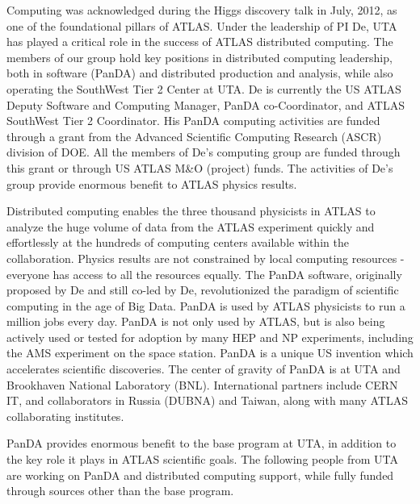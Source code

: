 
Computing was acknowledged during the Higgs discovery talk in July, 2012, as one of the foundational pillars of ATLAS. Under the leadership of PI De, UTA has played a critical role in the success of ATLAS distributed computing. The members of our group hold key positions in distributed computing leadership, both in software (PanDA) and distributed production and analysis, while also operating the SouthWest Tier 2 Center at UTA. De is currently the US ATLAS Deputy Software and Computing Manager, PanDA co-Coordinator, and ATLAS SouthWest Tier 2 Coordinator. His PanDA computing activities are funded through a grant from the Advanced Scientific Computing Research (ASCR) division of DOE. All the members of De's computing group are funded through this grant or through US ATLAS M\&O (project) funds. The activities of De's group provide enormous benefit to ATLAS physics results.

Distributed computing enables the three thousand physicists in ATLAS to analyze the huge volume of data from the ATLAS experiment quickly and effortlessly at the hundreds of computing centers available within the collaboration. Physics results are not constrained by local computing resources - everyone has access to all the resources equally. The PanDA software, originally proposed by De and still co-led by De, revolutionized the paradigm of scientific computing in the age of Big Data. PanDA is used by ATLAS physicists to run a million jobs every day. PanDA is not only used by ATLAS, but is also being actively used or tested for adoption by many HEP and NP experiments, including the AMS experiment on the space station. PanDA is a unique US invention which accelerates scientific discoveries. The center of gravity of PanDA is at UTA and Brookhaven National Laboratory (BNL). International partners include CERN IT, and collaborators in Russia (DUBNA) and Taiwan, along with many ATLAS collaborating institutes.

PanDA provides enormous benefit to the base program at UTA, in addition to the key role it plays in ATLAS scientific goals. The following people from UTA are working on PanDA and distributed computing support, while fully funded through sources other than the base program.

